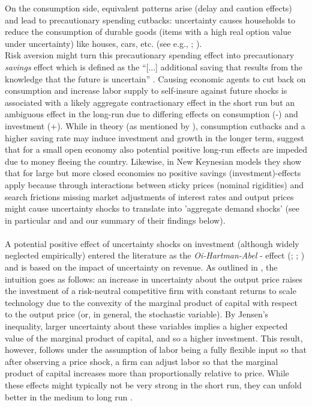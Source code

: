\documentclass[a4paper,11pt,listof=nochaptergap,oneside,pointednumbers,bibtotoc,bigheadings,liststotoc]{scrbook}
\begin{document}
On the consumption side, equivalent patterns arise (delay and caution effects) and lead to precautionary spending cutbacks: uncertainty causes households to reduce the consumption of durable goods (items with a high real option value under uncertainty) like houses, cars, etc. (see e.g., \citealp{eberly:94}; \citealp{romer:90}).\\
Risk aversion might turn this precautionary spending effect into precautionary \textit{savings} effect which is defined as the ``[...] additional saving that results from the knowledge that the future is uncertain'' \citep[p. 2]{carrollandkimball:06}. Causing economic agents to cut back on consumption and increase labor supply to self-insure against future shocks is associated with a likely aggregate contractionary effect in the short run but an ambiguous effect in the long-run due to differing effects on consumption (-) and investment (+). While in theory (as mentioned by \citealp{bloom:14}), consumption cutbacks and a higher saving rate may induce investment and growth in the longer term, \citet{villaverdeetal:11} suggest that for a small open economy also potential positive long-run effects are impeded due to money fleeing the country. Likewise, in New Keynesian models they show that for large but more closed economies no positive savings (investment)-effects apply because through interactions between sticky prices (nominal rigidities) and search frictions missing market adjustments of interest rates and output prices might cause uncertainty shocks to translate into 'aggregate demand shocks' (see in particular \citealp{leducandliu:16} and \citealp{basuandbundick:17} and our summary of their findings below).\\
\\
A potential positive effect of uncertainty shocks on investment (although widely neglected empirically) entered the literature as the \textit{Oi-Hartman-Abel} - effect (\citealp{oi:61}; \citealp{hartman:72}; \citealp{abel:83}) and is based on the impact of uncertainty on revenue. As outlined in \citet{saltarietal:kA}, the intuition goes as follows: an increase in uncertainty about the output price raises the investment of a risk-neutral competitive firm with constant returns to scale technology due to the convexity of the marginal product of capital with respect to the output price (or, in general, the stochastic variable). By Jensen’s inequality, larger uncertainty about these variables implies a higher expected value of the marginal product of capital, and so a higher investment. This result, however, follows under the assumption of labor being a fully flexible input so that after observing a price shock, a firm can adjust labor so that the marginal product of capital increases more than proportionally relative to price. While these effects might typically not be very strong in the short run, they can unfold better in the medium to long run \citep{bloom:14}.
\end{document}
